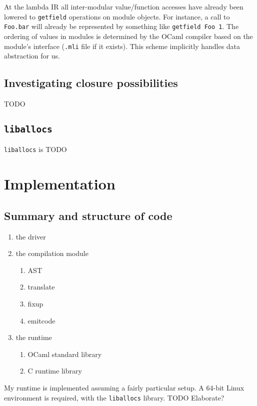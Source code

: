 \documentclass[12pt,a4paper,twoside,openright]{report}
\begin{document}
At the lambda IR all inter-modular value/function accesses have already been
lowered to \lstinline!getfield! operations on module objects. For instance, a
call to \lstinline!Foo.bar! will already be represented by something like
\lstinline!getfield Foo 1!. The ordering of values in modules is determined by
the OCaml compiler based on the module's interface (\lstinline!.mli! file if it
exists). This scheme implicitly handles data abstraction for us.

\section{Investigating closure possibilities}

TODO

\section{\texttt{liballocs}}

\lstinline!liballocs! is TODO


\chapter{Implementation}

\section{Summary and structure of code}

\begin{enumerate}
  \item the driver
  \item the compilation module
    \begin{enumerate}
      \item AST
      \item translate
      \item fixup
      \item emitcode
    \end{enumerate}
  \item the runtime
    \begin{enumerate}
      \item OCaml standard library
      \item C runtime library
    \end{enumerate}
\end{enumerate}

My runtime is implemented assuming a fairly particular setup. A 64-bit
Linux environment is required, with the \lstinline!liballocs! library. TODO Elaborate?
\end{document}
